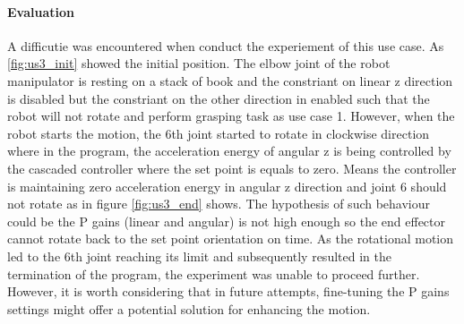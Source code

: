 \documentclass[report.tex]{subfiles}
\begin{document}
    \paragraph{\large{Evaluation}\\}
    A difficutie was encountered when conduct the experiement of this use case. As \ref{fig:us3_init} showed the initial position. The elbow joint of the robot manipulator is resting on a stack of book and the constriant on linear z direction is disabled but the constriant on the other direction in enabled such that the robot will not rotate and perform grasping task as use case 1. However, when the robot starts the motion, the 6th joint started to rotate in clockwise direction where in the program, the acceleration energy of angular z is being controlled by the cascaded controller where the set point is equals to zero. Means the controller is maintaining zero acceleration energy in angular z direction and joint 6 should not rotate as in figure \ref{fig:us3_end} shows. The hypothesis of such behaviour could be the P gains (linear and angular) is not high enough so the end effector cannot rotate back to the set point orientation on time. As the rotational motion led to the 6th joint reaching its limit and subsequently resulted in the termination of the program, the experiment was unable to proceed further. However, it is worth considering that in future attempts, fine-tuning the P gains settings might offer a potential solution for enhancing the motion.
\end{document}

